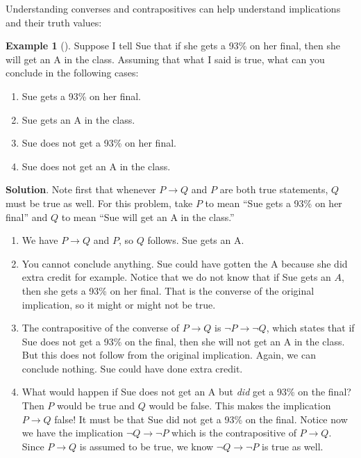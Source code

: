 \documentclass[10pt,]{book}
\theoremstyle{plain}
\theoremstyle{definition}
\theoremstyle{definition}
\newtheorem{example}[theorem]{Example}
\theoremstyle{definition}
\theoremstyle{definition}
\numberwithin{equation}{chapter}
\def\imp{\rightarrow}
\begin{document}
\hypertarget{p-1413}{}%
Understanding converses and contrapositives can help understand implications and their truth values:%
\begin{example}[]\label{example-35}
\hypertarget{p-1414}{}%
Suppose I tell Sue that if she gets a 93\% on her final, then she will get an A in the class. Assuming that what I said is true, what can you conclude in the following cases:%
\par
\hypertarget{p-1415}{}%
\leavevmode%
\begin{enumerate}
\item\hypertarget{li-297}{}\hypertarget{p-1416}{}%
Sue gets a 93\% on her final.%
\item\hypertarget{li-298}{}\hypertarget{p-1417}{}%
Sue gets an A in the class.%
\item\hypertarget{li-299}{}\hypertarget{p-1418}{}%
Sue does not get a 93\% on her final.%
\item\hypertarget{li-300}{}\hypertarget{p-1419}{}%
Sue does not get an A in the class.%
\end{enumerate}
%
\par\smallskip%
\noindent\textbf{Solution}.\hypertarget{solution-122}{}\quad%
\hypertarget{p-1420}{}%
Note first that whenever \(P \imp Q\) and \(P\) are both true statements, \(Q\) must be true as well. For this problem, take \(P\) to mean ``Sue gets a 93\% on her final'' and \(Q\) to mean ``Sue will get an A in the class.''%
\par
\hypertarget{p-1421}{}%
\leavevmode%
\begin{enumerate}
\item\hypertarget{li-301}{}\hypertarget{p-1422}{}%
We have \(P \imp Q\) and \(P\), so \(Q\) follows. Sue gets an A.%
\item\hypertarget{li-302}{}\hypertarget{p-1423}{}%
You cannot conclude anything. Sue could have gotten the A because she did extra credit for example. Notice that we do not know that if Sue gets an \(A\), then she gets a 93\% on her final. That is the converse of the original implication, so it might or might not be true.%
\item\hypertarget{li-303}{}\hypertarget{p-1424}{}%
The contrapositive of the converse of \(P \imp Q\) is \(\neg P \imp \neg Q\), which states that if Sue does not get a 93\% on the final, then she will not get an A in the class. But this does not follow from the original implication. Again, we can conclude nothing. Sue could have done extra credit.%
\item\hypertarget{li-304}{}\hypertarget{p-1425}{}%
What would happen if Sue does not get an A but \emph{did} get a 93\% on the final? Then \(P\) would be true and \(Q\) would be false. This makes the implication \(P \imp Q\) false! It must be that Sue did not get a 93\% on the final. Notice now we have the implication \(\neg Q \imp \neg P\) which is the contrapositive of \(P \imp Q\). Since \(P \imp Q\) is assumed to be true, we know \(\neg Q \imp \neg P\) is true as well.%
\end{enumerate}
%
\end{example}
\end{document}
